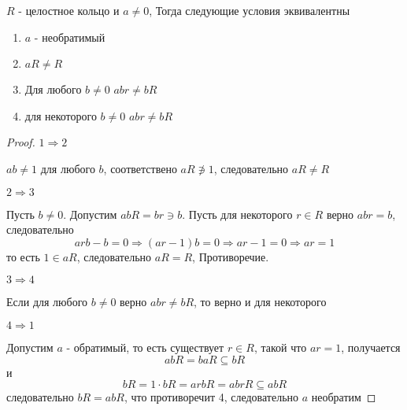 \documentclass[../main/document.tex]{subfiles}
\begin{document}
\begin{thm}\label{ID-properties}
$R$ - целостное кольцо и $a\neq 0$, Тогда следующие условия эквивалентны
\begin{enumerate}
\item $a$ - необратимый
\item $aR\neq R$
\item Для любого $b\neq 0$ $abr\neq bR$
\item для некоторого $b\neq 0$ $abr\neq bR$
\end{enumerate}
\begin{proof}

$1\Rightarrow 2$

$ab\neq 1$ для любого $b$, соответствено $aR\not\ni 1$, следовательно $aR\neq R$

$2\Rightarrow 3$

Пусть $b\neq 0$. Допустим $abR=br\ni b$. Пусть для некоторого $r\in R$ верно $abr=b$, следовательно
$$arb-b=0\Rightarrow (ar-1)b=0\Rightarrow ar-1=0\Rightarrow ar=1$$
то есть $1\in aR$, следовательно $aR=R$, Противоречие.

$3\Rightarrow 4$

Если для любого  $b\neq 0$ верно $abr\neq bR$, то верно и для некоторого

$4\Rightarrow 1$

Допустим $a$ - обратимый, то есть существует $r\in R$, такой что $ar=1$, получается
$$abR=baR\subseteq bR$$
и
$$bR=1\cdot bR=arbR=abrR\subseteq abR$$
следовательно $bR=abR$, что противоречит 4, следовательно $a$ необратим
\end{proof}
\end{thm}
\end{document}
